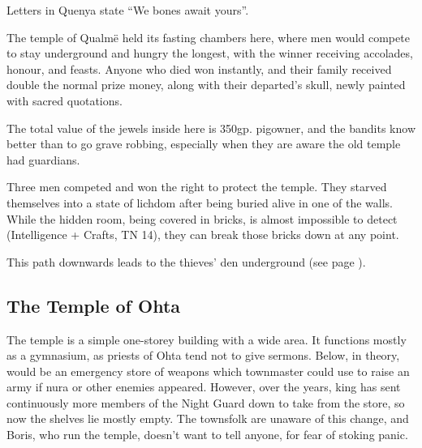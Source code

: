 \begin{multicols}{2}
\begin{boxtext}
	Letters in Quenya state ``We bones await yours''.
\end{boxtext}

The temple of Qualm\"{e} held its fasting chambers here, where men would compete to stay underground and hungry the longest, with the winner receiving accolades, honour, and feasts.  Anyone who died won instantly, and their family received double the normal prize money, along with their departed's skull, newly painted with sacred quotations.

The total value of the jewels inside here is 350gp.
\Gls{pigowner}, and the bandits know better than to go grave robbing, especially when they are aware the old temple had guardians.



Three men competed and won the right to protect the temple.
They starved themselves into a state of lichdom after being buried alive in one of the walls.
While the hidden room, being covered in bricks, is almost impossible to detect (Intelligence + Crafts, TN 14), they can break those bricks down at any point.


This path downwards leads to the thieves' den underground (see page \pageref{pigexit}).

\subsection{The Temple of Ohta}

The temple is a simple one-storey building with a wide area.
It functions mostly as a gymnasium, as priests of Ohta tend not to give sermons.
Below, in theory, would be an emergency store of weapons which \gls{townmaster} could use to raise an army if nura or other enemies appeared.
However, over the years, \gls{king} has sent continuously more members of the Night Guard down to take from the store, so now the shelves lie mostly empty.
The townsfolk are unaware of this change, and Boris, who run the temple, doesn't want to tell anyone, for fear of stoking panic.


\end{multicols}

\subsection{}

